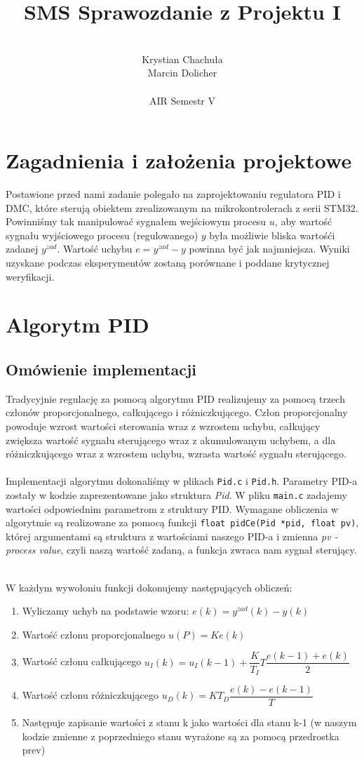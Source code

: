 \documentclass[12pt, a4paper]{article}
\author{
	\\ Krystian Chachuła
	\\ Marcin Dolicher
	\\
	\\ AIR Semestr V
}
\title{
    \quad \quad \quad \quad \quad SMS
	\newline
	Sprawozdanie z Projektu I		
}
\date{}
\begin{document}
\maketitle
\newpage
\tableofcontents

\newpage
\section{Zagadnienia i założenia projektowe}
Postawione przed nami zadanie polegało na zaprojektowaniu regulatora PID i DMC, które sterują obiektem zrealizowanym na mikrokontrolerach z serii STM32. Powinniśmy tak manipulować sygnałem wejściowym procesu $u$, aby wartość sygnału wyjściowego procesu (regulowanego) $y$ była możliwie bliska wartośći zadanej $y^{zad}$. Wartość uchybu $e=y^{zad} - y$ powinna być jak najmniejsza. Wyniki uzyskane podczas eksperymentów zostaną porównane i poddane krytycznej weryfikacji. 
\section{Algorytm PID}

\subsection{Omówienie implementacji}

Tradycyjnie regulację za pomocą algorytmu PID realizujemy za pomocą trzech członów proporcjonalnego, całkującego i różniczkującego. Człon proporcjonalny powoduje wzrost wartości sterowania wraz z wzrostem uchybu, całkujący zwiększa wartość sygnału sterującego wraz z akumulowanym uchybem, a dla różniczkującego wraz z wzrostem uchybu, wzrasta wartość sygnału sterującego. 
\\\\Implementacji algorytmu dokonaliśmy w plikach \verb|Pid.c| i \verb|Pid.h|. Parametry PID-a zostały w kodzie zaprezentowane jako struktura \textit{Pid}. W pliku \verb|main.c| zadajemy wartości odpowiednim parametrom z struktury PID. Wymagane obliczenia w algorytmie są realizowane za pomocą funkcji \verb|float pidCe(Pid *pid, float pv)|, której argumentami są struktura z wartościami naszego PID-a i zmienna \textit{pv - process value}, czyli naszą wartość zadaną, a funkcja zwraca nam sygnał sterujący. 

~\\ W każdym wywołoniu funkcji dokonujemy następujących obliczeń: 
\begin{enumerate}
\item Wyliczamy uchyb na podstawie wzoru: $e(k) = y^{zad}(k) - y(k)$
\item Wartość członu proporcjonalnego $u(P)=Ke(k)$
\item Wartość członu całkującego $u_{I}(k) = u_{I}(k-1) + \dfrac{K}{T_{I}}T\dfrac{e(k-1)+e(k)}{2}$
\item Wartość członu różniczkującego $u_{D}(k) = KT_{D}\dfrac{e(k)-e(k-1)}{T}$
\item Następuje zapisanie wartości z stanu k jako wartości dla stanu k-1 (w naszym kodzie zmienne z poprzedniego stanu wyrażone są za pomocą przedrostka prev)
\end{enumerate}
\end{document}
